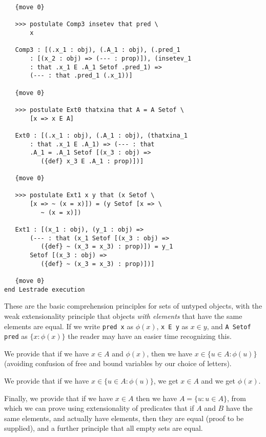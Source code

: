 \documentclass[12pt]{article}
\begin{document}
\begin{verbatim}
   {move 0}

   >>> postulate Comp3 insetev that pred \
       x

   Comp3 : [(.x_1 : obj), (.A_1 : obj), (.pred_1 
       : [(x_2 : obj) => (--- : prop)]), (insetev_1 
       : that .x_1 E .A_1 Setof .pred_1) => 
       (--- : that .pred_1 (.x_1))]

   {move 0}

   >>> postulate Ext0 thatxina that A = A Setof \
       [x => x E A]

   Ext0 : [(.x_1 : obj), (.A_1 : obj), (thatxina_1 
       : that .x_1 E .A_1) => (--- : that 
       .A_1 = .A_1 Setof [(x_3 : obj) => 
          ({def} x_3 E .A_1 : prop)])]

   {move 0}

   >>> postulate Ext1 x y that (x Setof \
       [x => ~ (x = x)]) = (y Setof [x => \
          ~ (x = x)])

   Ext1 : [(x_1 : obj), (y_1 : obj) => 
       (--- : that (x_1 Setof [(x_3 : obj) => 
          ({def} ~ (x_3 = x_3) : prop)]) = y_1 
       Setof [(x_3 : obj) => 
          ({def} ~ (x_3 = x_3) : prop)])]

   {move 0}
end Lestrade execution

\end{verbatim}

These are the basic comprehension principles for sets of untyped objects, with the weak extensionality principle that objects {\em with elements\/} that have the same elements are equal.  If we write {\tt pred x} as $\phi(x)$,
{\tt x E y} as $x \in y$, and {\tt A Setof pred} as $\{x : \phi(x)\}$ the reader may have an easier time recognizing this.

We provide that if we have $x \in A$ and $\phi(x)$, then we have $x \in \{u \in A:\phi(u)\}$ (avoiding confusion of free and bound variables by our choice of letters).

We provide that if we have $x \in \{u \in A:\phi(u)\}$, we get $x \in A$ and we get $\phi(x)$.

Finally, we provide that if we have $x \in A$ then we have $A = \{u:u \in A\}$, from which we can prove using extensionality of predicates that if $A$ and $B$ have the same elements, and actually have elements,
then they are equal (proof to be supplied), and a further principle that all empty sets are equal.
\end{document}
